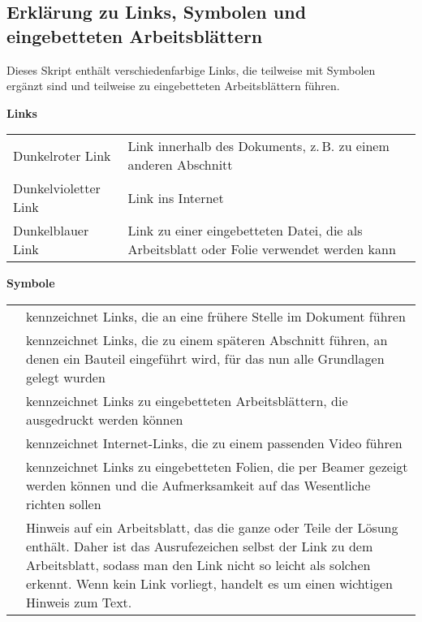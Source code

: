 \subsection{Erklärung zu Links, Symbolen und eingebetteten Arbeitsblättern}

Dieses Skript enthält verschiedenfarbige Links, die teilweise mit Symbolen ergänzt sind und teilweise zu eingebetteten Arbeitsblättern führen.

\bigskip
\textbf{Links}

\medskip
\begin{tabu} to \textwidth {X[l]X[3l]}
	\textcolor{red!60!black}{Dunkelroter Link} & Link innerhalb des Dokuments, z.\,B. zu einem anderen Abschnitt \\
	\textcolor{magenta!60!black}{Dunkelvioletter Link} & Link ins Internet \\
	\textcolor{blue!60!black}{Dunkelblauer Link} & Link zu einer eingebetteten Datei, die als Arbeitsblatt oder Folie verwendet werden kann\\
\end{tabu}

\bigskip
\textbf{Symbole}

\medskip
\begin{minipage}{\textwidth}
	\extrarowsep=3mm
	\begin{tabu} to \textwidth {X[l]X[l8]} 
		\zurueck & kennzeichnet Links, die an eine frühere Stelle im Dokument führen \\ 
		\werkzeug & kennzeichnet Links, die zu einem späteren Abschnitt führen, an denen ein Bauteil eingeführt wird, für das nun alle Grundlagen gelegt wurden \\ 
		\drucker & kennzeichnet Links zu eingebetteten Arbeitsblättern, die ausgedruckt werden können \\ 
		\video & kennzeichnet Internet-Links, die zu einem passenden Video führen \\ 
		\folie & kennzeichnet Links zu eingebetteten Folien, die per Beamer gezeigt werden können und die Aufmerksamkeit auf das Wesentliche richten sollen\\
		\ausrufezeichen & Hinweis auf ein Arbeitsblatt, das die ganze oder Teile der Lösung enthält. Daher ist das Ausrufezeichen selbst der Link zu dem Arbeitsblatt, sodass man den Link nicht so leicht als solchen erkennt. Wenn kein Link vorliegt, handelt es um einen wichtigen Hinweis zum Text. \\ 
	\end{tabu}
\end{minipage}



